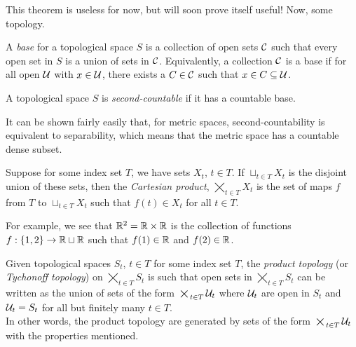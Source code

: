 This theorem is useless for now, but will soon prove itself useful! Now, some topology.

\begin{definition}
    A \emph{base} for a topological space $S$ is a collection of open sets $\cal{C}$ such that every open set in $S$ is a union of sets in $\cal{C}$. Equivalently, a collection $\cal{C}$ is a base if for all open $\cal{U}$ with $x \in \cal{U}$, there exists a $C \in \cal{C}$ such that $x \in C \subseteq \cal{U}$. 
\end{definition}

\begin{definition}
    A topological space $S$ is \emph{second-countable} if it has a countable base.
\end{definition}
It can be shown fairly easily that, for metric spaces, second-countability is equivalent to separability, which means that the metric space has a countable dense subset.\\

\begin{definition}
    Suppose for some index set $T$, we have sets $X_{t}$, $t \in T$. If $\sqcup_{t \in T} X_{t}$ is the disjoint union of these sets, then the \emph{Cartesian product}, $\bigtimes_{t \in T} X_{t}$ is the set of maps $f$ from $T$ to $\sqcup_{t \in T} X_{t}$ such that $f(t) \in X_{t}$ for all $t \in T$. 
\end{definition}

For example, we see that $\R^2 = \R \times \R$ is the collection of functions $f : \{1, 2\} \to \R \sqcup \R$ such that $f(1) \in \R$ and $f(2) \in \R$. 

\begin{definition}
    Given topological spaces $S_{t}$, $t \in T$ for some index set $T$, the \emph{product topology} (or \emph{Tychonoff topology}) on $\bigtimes_{t \in T} S_{t}$ is such that open sets in $\bigtimes_{t \in T} S_{t}$ can be written as the union of sets of the form $\bigtimes_{t \in T} \cal{U}_{t}$ where $\cal{U}_{t}$ are open in $S_{t}$ and $\cal{U}_{t} = S_{t}$ for all but finitely many $t \in T$.\\

    In other words, the product topology are generated by sets of the form $\bigtimes_{t \in T} \cal{U}_{t}$ with the properties mentioned.
\end{definition}

